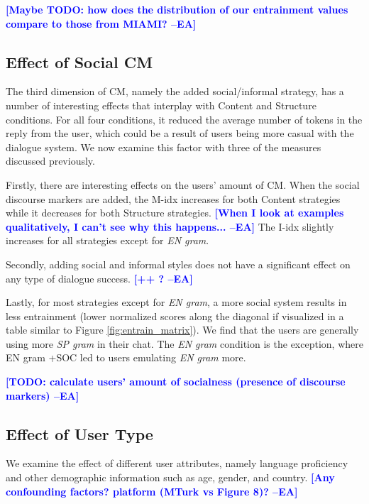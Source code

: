 \documentclass[11pt,a4paper]{article}
\newcommand{\ea}[1]{\textcolor{blue}{\bf\small [#1 --EA]}}
\begin{document}
\ea{Maybe TODO: how does the distribution of our entrainment values compare to those from MIAMI?}

\subsection{Effect of Social CM}
The third dimension of CM, namely the added social/informal strategy, has a number of interesting effects that interplay with Content and Structure conditions.
For all four conditions, it reduced the average number of tokens in the reply from the user, which could be a result of users being more casual with the dialogue system.
We now examine this factor with three of the measures discussed previously.

Firstly, there are interesting effects on the users' amount of CM.
When the social discourse markers are added, the M-idx increases for both Content strategies while it decreases for both Structure strategies. 
\ea{When I look at examples qualitatively, I can't see why this happens...}
The I-idx slightly increases for all strategies except for \textit{EN gram}.

Secondly, adding social and informal styles does not have a significant effect on any type of dialogue success.
\ea{++ ?}

Lastly, for most strategies except for \textit{EN gram}, a more social system results in less entrainment (lower normalized scores along the diagonal if visualized in a table similar to Figure \ref{fig:entrain_matrix}).
We find that the users are generally using more \textit{SP gram} in their chat.
The \textit{EN gram} condition is the exception, where {EN gram +SOC} led to users emulating \textit{EN gram} more.

\ea{TODO: calculate users' amount of socialness (presence of discourse markers)}

\subsection{Effect of User Type}

We examine the effect of different user attributes, namely language proficiency and other demographic information such as age, gender, and country. 
\ea{Any confounding factors? platform (MTurk vs Figure 8)?}
\end{document}
